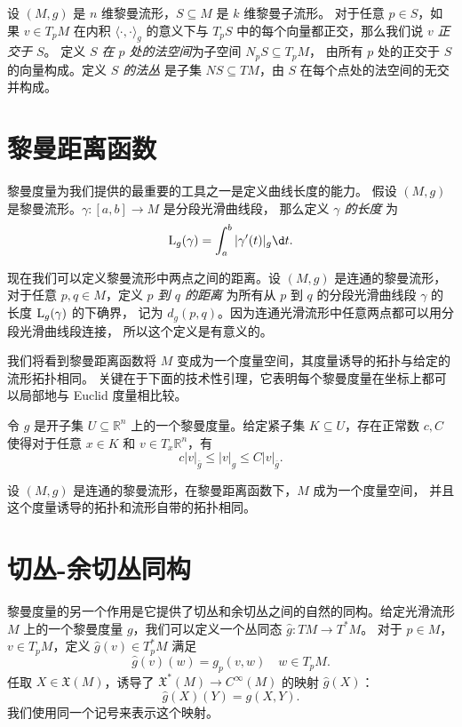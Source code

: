 设 $(M,g)$ 是 $n$ 维黎曼流形，$S\subseteq M$ 是 $k$ 维黎曼子流形。
对于任意 $p\in S$，如果 $v\in T_pM$ 在内积 $\langle\cdot,\cdot\rangle_g$
的意义下与 $T_pS$ 中的每个向量都正交，那么我们说 $v$ \emph{正交于 $S$}。
定义 \emph{$S$ 在 $p$ 处的法空间}为子空间 $N_pS\subseteq T_pM$，
由所有 $p$ 处的正交于 $S$ 的向量构成。定义 \emph{$S$ 的法丛}
是子集 $NS\subseteq TM$，由 $S$ 在每个点处的法空间的无交并构成。

\section{黎曼距离函数}

黎曼度量为我们提供的最重要的工具之一是定义曲线长度的能力。
假设 $(M,g)$ 是黎曼流形。$\gamma:[a,b]\to M$ 是分段光滑曲线段，
那么定义 \emph{$\gamma$ 的长度} 为
\[
  \LL_g(\gamma)=\int_a^b|\gamma'(t)|_g \d t.  
\]

现在我们可以定义黎曼流形中两点之间的距离。设 $(M,g)$ 是连通的黎曼流形，
对于任意 $p,q\in M$，定义 \emph{$p$ 到 $q$ 的距离} 为所有从 $p$
到 $q$ 的分段光滑曲线段 $\gamma$ 的长度 ${\mathrm{L}}_g(\gamma)$ 的下确界，
记为 $d_g(p,q)$。因为连通光滑流形中任意两点都可以用分段光滑曲线段连接，
所以这个定义是有意义的。

我们将看到黎曼距离函数将 $M$ 变成为一个度量空间，其度量诱导的拓扑与给定的流形拓扑相同。
关键在于下面的技术性引理，它表明每个黎曼度量在坐标上都可以局部地与 Euclid 度量相比较。

\begin{lemma}
  令 $g$ 是开子集 $U\subseteq \mathbb{R}^n$ 上的一个黎曼度量。给定紧子集 
  $K\subseteq U$，存在正常数 $c,C$ 使得对于任意 $x\in K$ 和 $v\in T_x \mathbb{R}^n$，有
  \[
    c|v|_{\bar g}\leq |v|_g\leq C|v|_{\bar g}.  
  \]
\end{lemma}

\begin{theorem}[黎曼流形作为度量空间]
  设 $(M,g)$ 是连通的黎曼流形，在黎曼距离函数下，$M$ 成为一个度量空间，
  并且这个度量诱导的拓扑和流形自带的拓扑相同。
\end{theorem}


\section{切丛-余切丛同构}

黎曼度量的另一个作用是它提供了切丛和余切丛之间的自然的同构。给定光滑流形 $M$
上的一个黎曼度量 $g$，我们可以定义一个丛同态 $\hat g:TM\to T^*M$。
对于 $p\in M$，$v\in T_pM$，定义 $\hat g(v)\in T_p^*M$ 满足
\[
  \hat g(v)(w)=g_p(v,w)\quad w\in T_pM.  
\]
任取 $X\in \mathfrak{X}(M)$，诱导了 $\mathfrak{X}^*(M) \to C^\infty(M)$ 的映射 $\hat g(X)$：
\[
  \hat g(X)(Y)=g(X,Y).   
\]
我们使用同一个记号来表示这个映射。

